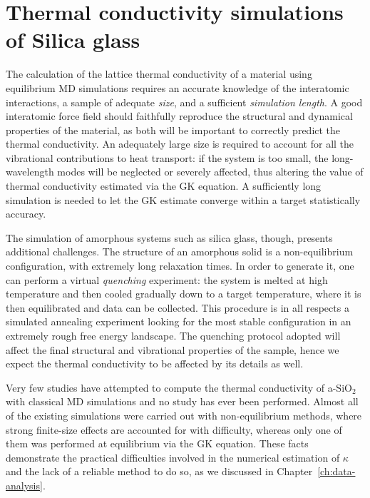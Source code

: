 \chapter{Thermal conductivity simulations of Silica glass}  \label{ch:silica}


The calculation of the lattice thermal conductivity of a material using equilibrium MD simulations requires an accurate knowledge of the interatomic interactions, a sample of adequate \emph{size}, and a sufficient \emph{simulation length}. 
A good interatomic force field should faithfully reproduce the structural and dynamical properties of the material, as both will be important to correctly predict the thermal conductivity. 
An adequately large size is required to account for all the vibrational contributions to heat transport: if the system is too small, the long-wavelength modes will be neglected or severely affected, thus altering the value of thermal conductivity estimated via the GK equation. 
A sufficiently long simulation is needed to let the GK estimate converge within a target statistically accuracy. 

The simulation of amorphous systems such as silica glass, though, presents additional challenges. The structure of an amorphous solid is a non-equilibrium configuration, with extremely long relaxation times. 
In order to generate it, one can perform a virtual \emph{quenching} experiment: the system is melted at high temperature and then cooled gradually down to a target temperature, where it is then equilibrated and data can be collected. 
This procedure is in all respects a simulated annealing experiment looking for the most stable configuration in an extremely rough free energy landscape. 
The quenching protocol adopted will affect the final structural and vibrational properties of the sample, hence we expect the thermal conductivity to be affected by its details as well. 

Very few studies have attempted to compute the thermal conductivity of a-SiO$_2$ with classical MD simulations and no \abinitio study has ever been performed. Almost all of the existing simulations were carried out with non-equilibrium methods, where strong finite-size effects are accounted for with difficulty, whereas only one of them was performed at equilibrium via the GK equation. 
These facts demonstrate the practical difficulties involved in the numerical estimation of $\kappa$ and the lack of a reliable method to do so, as we discussed in Chapter~\ref{ch:data-analysis}. 

